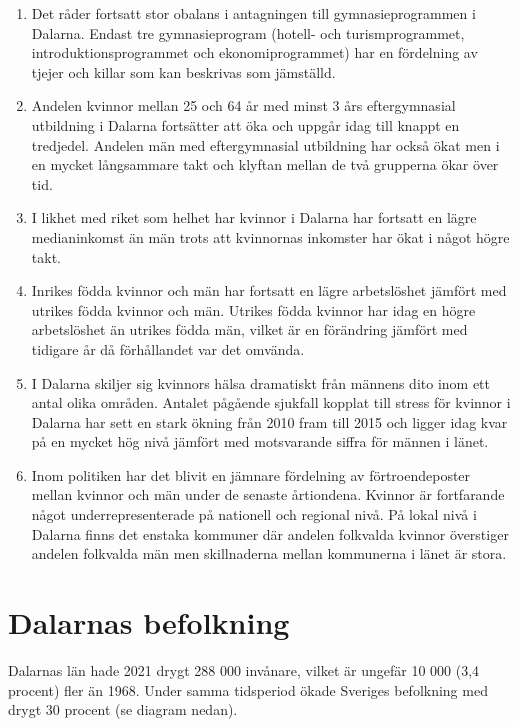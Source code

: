 \documentclass[
]{article}
\begin{document}
\begin{enumerate}
\def\labelenumi{\arabic{enumi}.}
\item
  Det råder fortsatt stor obalans i antagningen till gymnasieprogrammen
  i Dalarna. Endast tre gymnasieprogram (hotell- och turismprogrammet,
  introduktionsprogrammet och ekonomiprogrammet) har en fördelning av
  tjejer och killar som kan beskrivas som jämställd.
\item
  Andelen kvinnor mellan 25 och 64 år med minst 3 års eftergymnasial
  utbildning i Dalarna fortsätter att öka och uppgår idag till knappt en
  tredjedel. Andelen män med eftergymnasial utbildning har också ökat
  men i en mycket långsammare takt och klyftan mellan de två grupperna
  ökar över tid.
\item
  I likhet med riket som helhet har kvinnor i Dalarna har fortsatt en
  lägre medianinkomst än män trots att kvinnornas inkomster har ökat i
  något högre takt.
\item
  Inrikes födda kvinnor och män har fortsatt en lägre arbetslöshet
  jämfört med utrikes födda kvinnor och män. Utrikes födda kvinnor har
  idag en högre arbetslöshet än utrikes födda män, vilket är en
  förändring jämfört med tidigare år då förhållandet var det omvända.
\item
  I Dalarna skiljer sig kvinnors hälsa dramatiskt från männens dito inom
  ett antal olika områden. Antalet pågående sjukfall kopplat till stress
  för kvinnor i Dalarna har sett en stark ökning från 2010 fram till
  2015 och ligger idag kvar på en mycket hög nivå jämfört med
  motsvarande siffra för männen i länet.
\item
  Inom politiken har det blivit en jämnare fördelning av
  förtroendeposter mellan kvinnor och män under de senaste årtiondena.
  Kvinnor är fortfarande något underrepresenterade på nationell och
  regional nivå. På lokal nivå i Dalarna finns det enstaka kommuner där
  andelen folkvalda kvinnor överstiger andelen folkvalda män men
  skillnaderna mellan kommunerna i länet är stora.
\end{enumerate}

\hypertarget{dalarnas-befolkning}{%
\section{Dalarnas befolkning}\label{dalarnas-befolkning}}

Dalarnas län hade 2021 drygt 288 000 invånare, vilket är ungefär 10 000
(3,4 procent) fler än 1968. Under samma tidsperiod ökade Sveriges
befolkning med drygt 30 procent (se diagram nedan).
\end{document}
